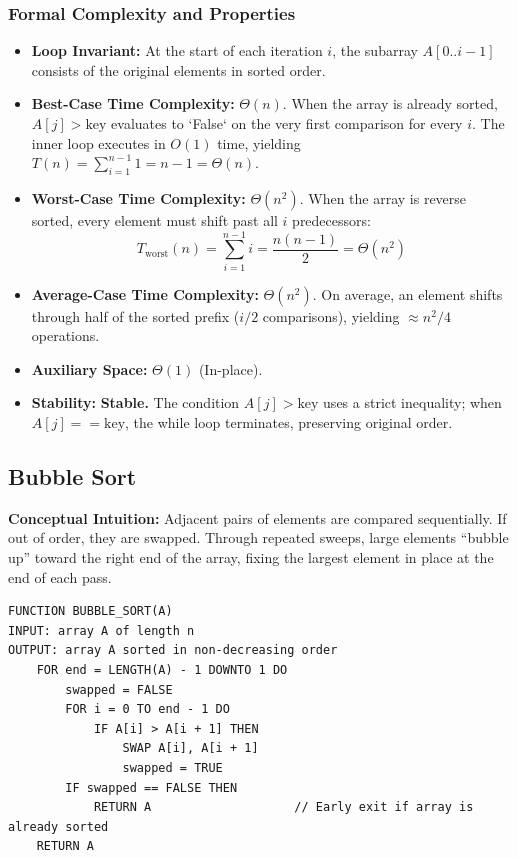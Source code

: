 \documentclass[11pt,a4paper]{article}
\begin{document}
\subsubsection{Formal Complexity and Properties}
\begin{itemize}[itemsep=2pt]
    \item \textbf{Loop Invariant:} At the start of each iteration $i$, the subarray $A[0..i-1]$ consists of the original elements in sorted order.
    \item \textbf{Best-Case Time Complexity:} $\Theta(n)$. When the array is already sorted, $A[j] > \text{key}$ evaluates to `False` on the very first comparison for every $i$. The inner loop executes in $O(1)$ time, yielding $T(n) = \sum_{i=1}^{n-1} 1 = n - 1 = \Theta(n)$.
    \item \textbf{Worst-Case Time Complexity:} $\Theta(n^2)$. When the array is reverse sorted, every element must shift past all $i$ predecessors:
    \[
    T_{\text{worst}}(n) = \sum_{i=1}^{n-1} i = \frac{n(n-1)}{2} = \Theta(n^2)
    \]
    \item \textbf{Average-Case Time Complexity:} $\Theta(n^2)$. On average, an element shifts through half of the sorted prefix ($i/2$ comparisons), yielding $\approx n^2/4$ operations.
    \item \textbf{Auxiliary Space:} $\Theta(1)$ (In-place).
    \item \textbf{Stability:} \textbf{Stable.} The condition $A[j] > \text{key}$ uses a strict inequality; when $A[j] == \text{key}$, the while loop terminates, preserving original order.
\end{itemize}

\subsection{Bubble Sort}
\textbf{Conceptual Intuition:} Adjacent pairs of elements are compared sequentially. If out of order, they are swapped. Through repeated sweeps, large elements ``bubble up'' toward the right end of the array, fixing the largest element in place at the end of each pass.

\begin{lstlisting}[style=pseudostyle]
FUNCTION BUBBLE_SORT(A)
INPUT: array A of length n
OUTPUT: array A sorted in non-decreasing order
    FOR end = LENGTH(A) - 1 DOWNTO 1 DO
        swapped = FALSE
        FOR i = 0 TO end - 1 DO
            IF A[i] > A[i + 1] THEN
                SWAP A[i], A[i + 1]
                swapped = TRUE
        IF swapped == FALSE THEN
            RETURN A                    // Early exit if array is already sorted
    RETURN A
\end{lstlisting}
\end{document}
